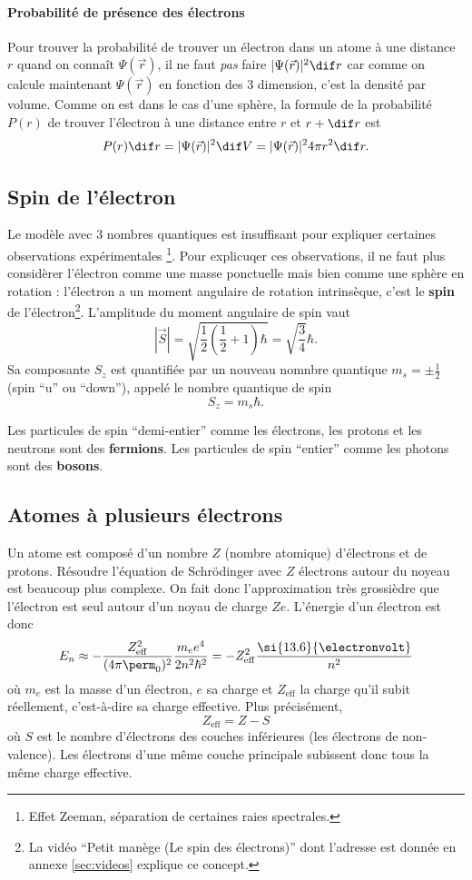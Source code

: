 \paragraph{Probabilité de présence des électrons}
Pour trouver la probabilité de trouver un électron dans un atome
à une distance $r$ quand on connaît $\Psi(\vec{r})$,
il ne faut \emph{pas} faire $|\Psi(\vec{r})|^2 \dif r$
car comme on calcule maintenant $\Psi(\vec{r})$ en fonction des 3 dimension,
c'est la densité par volume.
Comme on est dans le cas d'une sphère, la formule de la probabilité
$P(r)$ de trouver l'électron à une distance entre $r$ et $r+\dif r$ est
\[ P(r) \dif r = |\Psi(\vec{r})|^2 \dif V
= |\Psi(\vec{r})|^2 4\pi r^2 \dif r. \]

\subsection{Spin de l'électron}
Le modèle avec 3 nombres quantiques est insuffisant
pour expliquer certaines observations expérimentales
\footnote{Effet Zeeman, séparation de certaines raies
spectrales.}. Pour explicuqer ces observations, il ne faut
plus considèrer l'électron comme une masse ponctuelle
mais bien comme une sphère en rotation : l'électron
a un moment angulaire de rotation intrinsèque, c'est
le \textbf{spin} de l'électron\footnote{La vidéo ``Petit
manège (Le spin des électrons)'' dont l'adresse est donnée
en annexe \ref{sec:videos} explique ce concept.}.
L'amplitude du moment angulaire de spin vaut
\[ |\vec{S}| = \sqrt{\frac{1}{2}(\frac{1}{2}+1)\hbar} 
= \sqrt{\frac{3}{4}}\hbar.\]
Sa composante $S_z$ est quantifiée par un nouveau
nomnbre quantique $m_s = \pm\frac{1}{2}$ (spin ``u''
ou ``down''), appelé le nombre quantique de spin
\[ S_z = m_s\hbar. \] 

\begin{myrem}
	Les particules de spin ``demi-entier'' comme les
	électrons, les protons et les neutrons sont des \textbf{fermions}.
	Les particules de spin ``entier'' comme les photons sont
	des \textbf{bosons}.
\end{myrem}

\subsection{Atomes à plusieurs électrons}
Un atome est composé d'un nombre $Z$ (nombre atomique)
d'électrons et de protons. Résoudre l'équation de Schrödinger
avec $Z$ électrons autour du noyeau est beaucoup plus complexe.
On fait donc l'approximation très grossièdre que l'électron
est seul autour d'un noyau de charge $Ze$.
L'énergie d'un électron est donc
\[ E_n \approx -\frac{Z_\mathrm{eff}^2}{(4\pi\perm_0)^2}\frac{m_ee^4}{2n^2\hbar^2}
= -Z_\mathrm{eff}^2\frac{\si{13.6}{\electronvolt}}{n^2} \]
où $m_e$ est la masse d'un électron, $e$ sa charge et
$Z_\mathrm{eff}$ la charge qu'il subit réellement,
c'est-à-dire sa charge effective.
Plus précisément, 
\[ Z_\mathrm{eff} = Z - S \] 
où $S$ est le nombre d'électrons des couches inférieures (les électrons de non-valence).
Les électrons d'une même couche principale subissent donc tous la même charge effective.


